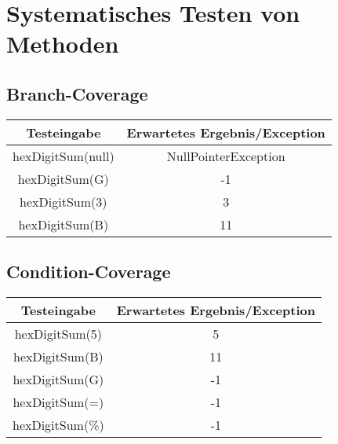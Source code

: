 \chapter{Systematisches Testen von Methoden}
\section{Branch-Coverage}
\begin{center}
	\begin{tabular}{ c  c }
		\hline
		Testeingabe & Erwartetes Ergebnis/Exception \\
		\hline 
		hexDigitSum(null) & NullPointerException   \\     
		hexDigitSum(G) & -1   \\
		hexDigitSum(3) & 3   \\
		hexDigitSum(B) &  11  \\
	\end{tabular}
\end{center}


\section{Condition-Coverage}
\begin{center}
	\begin{tabular}{ c c }
		\hline
		Testeingabe & Erwartetes Ergebnis/Exception \\
		\hline   
		hexDigitSum(5) &  5  \\   
		hexDigitSum(B) &  11  \\
		hexDigitSum(G) &   -1 \\
		hexDigitSum(=) &   -1 \\
		hexDigitSum(\%) &  -1
	\end{tabular}
\end{center}